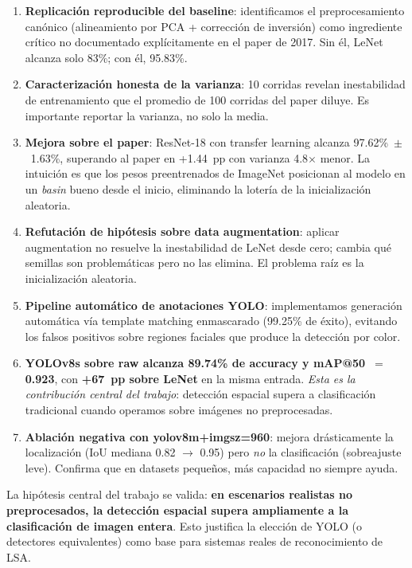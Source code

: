 \documentclass[a4paper,11pt]{article}
\begin{document}
\begin{enumerate}[itemsep=2pt]
    \item \textbf{Replicación reproducible del baseline}: identificamos el preprocesamiento canónico (alineamiento por PCA + corrección de inversión) como ingrediente crítico no documentado explícitamente en el paper de 2017. Sin él, LeNet alcanza solo 83\%; con él, 95.83\%.
    \item \textbf{Caracterización honesta de la varianza}: 10 corridas revelan inestabilidad de entrenamiento que el promedio de 100 corridas del paper diluye. Es importante reportar la varianza, no solo la media.
    \item \textbf{Mejora sobre el paper}: ResNet-18 con transfer learning alcanza 97.62\%~$\pm$~1.63\%, superando al paper en +1.44~pp con varianza 4.8$\times$ menor. La intuición es que los pesos preentrenados de ImageNet posicionan al modelo en un \textit{basin} bueno desde el inicio, eliminando la lotería de la inicialización aleatoria.
    \item \textbf{Refutación de hipótesis sobre data augmentation}: aplicar augmentation no resuelve la inestabilidad de LeNet desde cero; cambia qué semillas son problemáticas pero no las elimina. El problema raíz es la inicialización aleatoria.
    \item \textbf{Pipeline automático de anotaciones YOLO}: implementamos generación automática vía template matching enmascarado (99.25\% de éxito), evitando los falsos positivos sobre regiones faciales que produce la detección por color.
    \item \textbf{YOLOv8s sobre raw alcanza 89.74\% de accuracy y mAP@50~$=~$0.923}, con \textbf{+67~pp sobre LeNet} en la misma entrada. \emph{Esta es la contribución central del trabajo}: detección espacial supera a clasificación tradicional cuando operamos sobre imágenes no preprocesadas.
    \item \textbf{Ablación negativa con yolov8m+imgsz=960}: mejora drásticamente la localización (IoU mediana 0.82 $\rightarrow$ 0.95) pero \emph{no} la clasificación (sobreajuste leve). Confirma que en datasets pequeños, más capacidad no siempre ayuda.
\end{enumerate}

La hipótesis central del trabajo se valida: \textbf{en escenarios realistas no preprocesados, la detección espacial supera ampliamente a la clasificación de imagen entera}. Esto justifica la elección de YOLO (o detectores equivalentes) como base para sistemas reales de reconocimiento de LSA.
\end{document}
